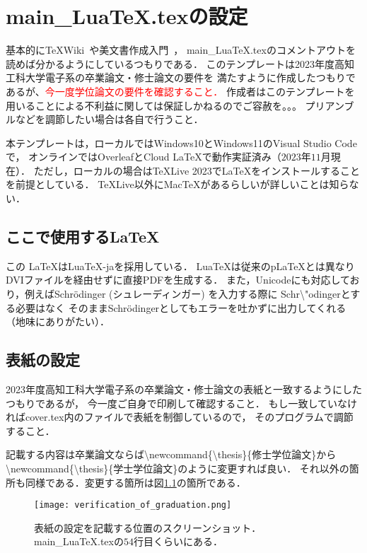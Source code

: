\chapter{main\_LuaTeX.texの設定}
基本的に\TeX Wiki~\cite{luatex}や美文書作成入門~\cite{美文書作成入門}，
main\_LuaTeX.texのコメントアウトを読めば分かるようにしているつもりである．
このテンプレートは2023年度高知工科大学電子系の卒業論文・修士論文の要件を
満たすように作成したつもりであるが、\textcolor{red}{今一度学位論文の要件を確認すること．}
作成者はこのテンプレートを用いることによる不利益に関しては保証しかねるのでご容赦を。。。
プリアンブルなどを調節したい場合は各自で行うこと．

本テンプレートは，ローカルではWindows10とWindows11のVisual Studio Codeで，
オンラインではOverleafとCloud LaTeXで動作実証済み（$2023$年$11$月現在）．
ただし，ローカルの場合は\TeX Live 2023で\LaTeX をインストールすることを前提としている．
\TeX Live以外にMac\TeX があるらしいが詳しいことは知らない．

\section{ここで使用する\LaTeX}
この \LaTeX はLua\TeX -jaを採用している．
Lua\TeX は従来のp\LaTeX とは異なりDVIファイルを経由せずに直接PDFを生成する．
また，Unicodeにも対応しており，例えばSchr\"odinger (シュレーディンガー) を入力する際に
Schr\textbackslash "odingerとする必要はなく
そのままSchrödingerとしてもエラーを吐かずに出力してくれる（地味にありがたい）．

\section{表紙の設定}
2023年度高知工科大学電子系の卒業論文・修士論文の表紙と一致するようにしたつもりであるが，
今一度ご自身で印刷して確認すること．
もし一致していなければcover.tex内のファイルで表紙を制御しているので，
そのプログラムで調節すること．

記載する内容は卒業論文ならば\textbackslash newcommand\{\textbackslash thesis\}\{修士学位論文\}から
\textbackslash newcommand\{\textbackslash thesis\}\{学士学位論文\}のように変更すれば良い．
それ以外の箇所も同様である．変更する箇所は図\ref{fig:cover}の箇所である．

\begin{figure}[h]
  \centering
  \texttt{[image: verification\_of\_graduation.png]}
  \caption{表紙の設定を記載する位置のスクリーンショット．main\_LuaTeX.texの$54$行目くらいにある．}
  \label{fig:cover}
\end{figure}

